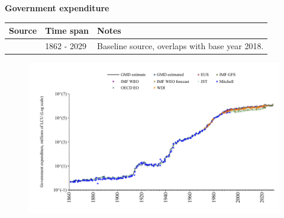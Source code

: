 \documentclass[12pt,a4paper,landscape]{article}
\begin{document}
\begin{adjustbox}{max totalsize={\paperwidth}{\paperheight},center}
\begin{minipage}[t][\textheight][t]{\textwidth}
\vspace*{0.5cm}
{}
\begin{center}
{\Large\bfseries Government expenditure}
\end{center}
\vspace{0.5cm}
\begin{table}[H]
\centering
\small
\begin{tabular}{|l|l|l|}
\hline
\textbf{Source} & \textbf{Time span} & \textbf{Notes} \\
\hline
\rowcolor{white}\cite{GMD_estimated}& 1862 - 2029 &Baseline source, overlaps with base year 2018. \\
\hline
\end{tabular}
\end{table}
\begin{figure}[H]
\centering
\includegraphics[width=\textwidth,height=0.6\textheight,keepaspectratio]{graphs/ITA_govexp.pdf}
\end{figure}
\end{minipage}
\end{adjustbox}
\end{document}
